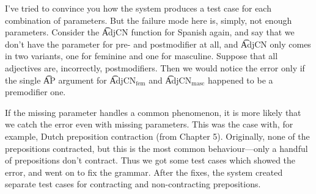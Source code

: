 I've tried to convince you how the system produces a test case for
each combination of parameters. But the failure mode here is, simply,
not enough parameters.  Consider the \t{AdjCN} function for Spanish
again, and say that we don’t have the parameter for pre- and
postmodifier at all, and \t{AdjCN} only comes in two variants, one for
feminine and one for masculine. Suppose that all adjectives are,
incorrectly, postmodifiers. Then we would notice the error only if the
single \t{AP} argument for \t{AdjCN$_{\text{fem}}$} and
\t{AdjCN$_{\text{masc}}$} happened to be a premodifier one.

If the missing parameter handles a common phenomenon, it is more
likely that we catch the error even with missing parameters. This was
the case with, for example, Dutch preposition contraction (from
Chapter 5). Originally, none of the prepositions contracted, but this
is the most common behaviour—only a handful of prepositions don’t
contract. Thus we got some test cases which showed the error, and went
on to fix the grammar. After the fixes, the system created separate
test cases for contracting and non-contracting prepositions.

